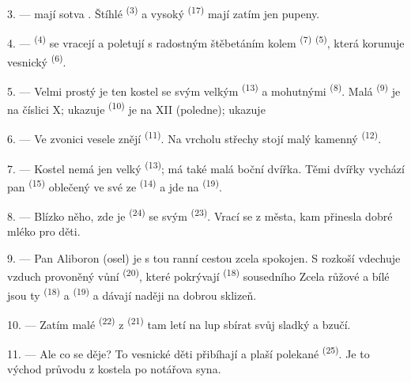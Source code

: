 3. ---  mají sotva . Štíhlé  \textsuperscript{(3)}
a vysoký  \textsuperscript{(17)} mají zatím jen pupeny.

4. ---  \textsuperscript{(4)} se vracejí a poletují s radostným štěbetáním
kolem  \textsuperscript{(7)}  \textsuperscript{(5)}, která
korunuje vesnický  \textsuperscript{(6)}.

\VUsaut{3.4mm}
\VUsaut{3.0mm}

5. --- Velmi prostý je ten kostel se svým velkým  \textsuperscript{(13)} a
mohutnými  \textsuperscript{(8)}. Malá
 \textsuperscript{(9)} je na číslici X; ukazuje 
 \textsuperscript{(10)} je na XII (poledne); ukazuje 

6. --- Ve zvonici vesele znějí  \textsuperscript{(11)}. Na vrcholu střechy stojí
malý kamenný  \textsuperscript{(12)}.

7. --- Kostel nemá jen velký  \textsuperscript{(13)}; má také malá boční
dvířka. Těmi dvířky vychází pan  \textsuperscript{(15)} oblečený ve své
 ze  \textsuperscript{(14)} a jde na
 \textsuperscript{(19)}.

8. --- Blízko něho, zde je  \textsuperscript{(24)} se svým
 \textsuperscript{(23)}. Vrací se z města, kam přinesla dobré mléko pro
děti.

\VUsaut{4.0mm}
\VUsaut{3.4mm}

9. --- Pan Aliboron (osel) je s tou ranní cestou zcela spokojen. S rozkoší vdechuje vzduch
provoněný vůní  \textsuperscript{(20)}, které pokrývají
 \textsuperscript{(18)} sousedního 
Zcela růžové a bílé jsou ty  \textsuperscript{(18)} a
 \textsuperscript{(19)} a dávají naději na dobrou sklizeň.

10. --- Zatím malé  \textsuperscript{(22)} z  \textsuperscript{(21)}
tam letí na lup sbírat svůj sladký  a bzučí.

11. --- Ale co se děje? To vesnické děti přibíhají a plaší polekané 
\textsuperscript{(25)}. Je to východ průvodu z kostela po  notářova syna.

